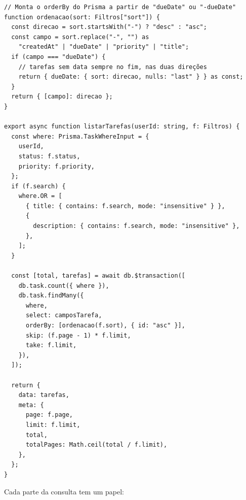 \begin{codigo}
\begin{Verbatim}[breaklines=true, breaksymbolleft={}, fontsize=\footnotesize]
// Monta o orderBy do Prisma a partir de "dueDate" ou "-dueDate"
function ordenacao(sort: Filtros["sort"]) {
  const direcao = sort.startsWith("-") ? "desc" : "asc";
  const campo = sort.replace("-", "") as
    "createdAt" | "dueDate" | "priority" | "title";
  if (campo === "dueDate") {
    // tarefas sem data sempre no fim, nas duas direções
    return { dueDate: { sort: direcao, nulls: "last" } } as const;
  }
  return { [campo]: direcao };
}

export async function listarTarefas(userId: string, f: Filtros) {
  const where: Prisma.TaskWhereInput = {
    userId,
    status: f.status,
    priority: f.priority,
  };
  if (f.search) {
    where.OR = [
      { title: { contains: f.search, mode: "insensitive" } },
      {
        description: { contains: f.search, mode: "insensitive" },
      },
    ];
  }

  const [total, tarefas] = await db.$transaction([
    db.task.count({ where }),
    db.task.findMany({
      where,
      select: camposTarefa,
      orderBy: [ordenacao(f.sort), { id: "asc" }],
      skip: (f.page - 1) * f.limit,
      take: f.limit,
    }),
  ]);

  return {
    data: tarefas,
    meta: {
      page: f.page,
      limit: f.limit,
      total,
      totalPages: Math.ceil(total / f.limit),
    },
  };
}
\end{Verbatim}
\end{codigo}

Cada parte da consulta tem um papel:

